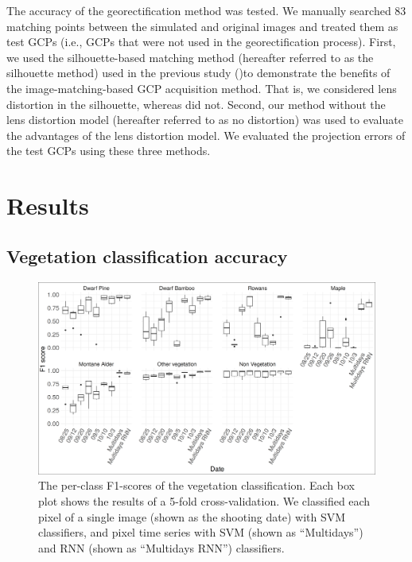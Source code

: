 \documentclass{article}
\begin{document}
The accuracy of the georectification method was tested. We manually searched 83 matching points between the simulated and original images and treated them as test GCPs (i.e., GCPs that were not used in the georectification process). First, we used the silhouette-based matching method (hereafter referred to as the silhouette method) used in the previous study (\cite{Portenier2020Cryosphere})to demonstrate the benefits of the image-matching-based GCP acquisition method. That is, we considered lens distortion in the silhouette, whereas \cite{Portenier2020Cryosphere} did not. Second, our method without the lens distortion model (hereafter referred to as no distortion) was used to evaluate the advantages of the lens distortion model. We evaluated the projection errors of the test GCPs using these three methods.

\hypertarget{results}{%
\section{Results}\label{results}}

\hypertarget{vegetation-classification-accuracy}{%
\subsection{Vegetation classification accuracy}\label{vegetation-classification-accuracy}}



\begin{figure}
\includegraphics[width=1\linewidth]{paper_files/figures/cv} \caption{The per-class F1-scores of the vegetation classification. Each box plot shows the results of a 5-fold cross-validation. We classified each pixel of a single image (shown as the shooting date) with SVM classifiers, and pixel time series with SVM (shown as ``Multidays'') and RNN (shown as ``Multidays RNN'') classifiers.}\label{fig:vegeacc}
\end{figure}
\end{document}
